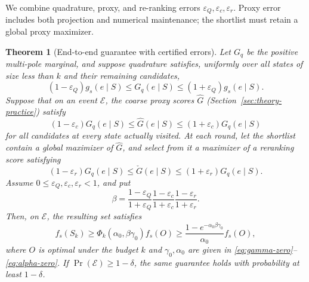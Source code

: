 \documentclass[conference]{IEEEtran}
\newtheorem{theorem}{Theorem}
\theoremstyle{definition}
\begin{document}
We combine quadrature, proxy, and re-ranking errors
$\varepsilon_Q,\varepsilon_c,\varepsilon_r$. Proxy error includes
both projection and numerical maintenance; the shortlist must retain
a global proxy maximizer.

\begin{theorem}[End-to-end guarantee with certified errors]
\label{thm:end-to-end-greedy}
Let $G_q$ be the positive multi-pole marginal, and suppose quadrature
satisfies, uniformly over all states of size less than $k$ and their
remaining candidates,
\begin{equation}
 (1-\varepsilon_Q)g_s(e\mid S)\leq G_q(e\mid S)
                         \leq(1+\varepsilon_Q)g_s(e\mid S).
 \label{eq:end-to-end-quadrature}
\end{equation}
Suppose that on an event $\mathcal E$, the coarse proxy scores
$\widehat G$ (Section~\ref{sec:theory-practice}) satisfy
\begin{equation}
 (1-\varepsilon_c)G_q(e\mid S)\leq\widehat G(e\mid S)
                         \leq(1+\varepsilon_c)G_q(e\mid S)
 \label{eq:end-to-end-coarse}
\end{equation}
for all candidates at every state actually visited.
At each round, let the shortlist contain a global maximizer of
$\widehat G$, and select from it a maximizer of a reranking score
satisfying
\begin{equation}
 (1-\varepsilon_r)G_q(e\mid S)\leq\check G(e\mid S)
                         \leq(1+\varepsilon_r)G_q(e\mid S).
 \label{eq:end-to-end-rerank}
\end{equation}
Assume $0\leq\varepsilon_Q,\varepsilon_c,\varepsilon_r<1$, and put
\[
 \beta=
 \frac{1-\varepsilon_Q}{1+\varepsilon_Q}
 \frac{1-\varepsilon_c}{1+\varepsilon_c}
 \frac{1-\varepsilon_r}{1+\varepsilon_r}.
\]
Then, on $\mathcal E$, the resulting set satisfies
\begin{equation}
 f_s(S_k)\geq \Phi_k(\alpha_0,\beta\gamma_0)f_s(O)
 \geq\frac{1-e^{-\alpha_0\beta\gamma_0}}{\alpha_0}f_s(O),
 \label{eq:end-to-end-guarantee}
\end{equation}
where $O$ is optimal under the budget $k$ and $\gamma_0,\alpha_0$
are given in \eqref{eq:gamma-zero}--\eqref{eq:alpha-zero}.
If $\Pr(\mathcal E)\geq1-\delta$, the same guarantee holds with
probability at least $1-\delta$.
\end{theorem}
\end{document}
